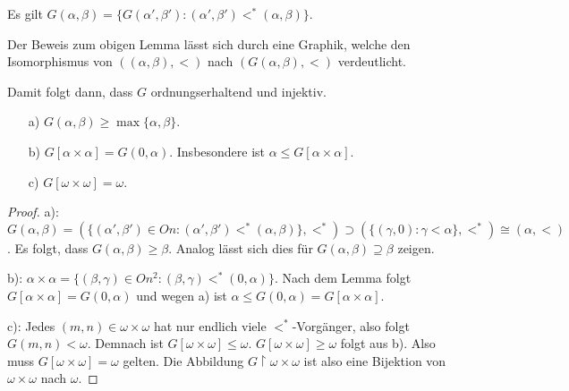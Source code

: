 \begin{lemma}
	Es gilt $G(\alpha,\beta)=\{G(\alpha',\beta'):(\alpha',\beta')<^\ast(\alpha,\beta)\}$.
\end{lemma}
Der Beweis zum obigen Lemma lässt sich durch eine Graphik, welche den Isomorphismus von $((\alpha,\beta),<)$ nach $(G(\alpha,\beta), <)$ verdeutlicht.

Damit folgt dann, dass $G$ ordnungserhaltend und injektiv.

\begin{lemma}
	\begin{itemize}
		\item[a)] $G(\alpha, \beta)\geq\max\{\alpha,\beta\}$.
		\item[b)] $G[\alpha\times\alpha]=G(0,\alpha)$. Insbesondere ist $\alpha \leq G[\alpha\times\alpha]$.
		\item[c)] $G[\omega\times\omega]=\omega$.
	\end{itemize}
\end{lemma}
\begin{proof}
	a): $G(\alpha,\beta)=(\{(\alpha',\beta')\in On : (\alpha',\beta')<^\ast(\alpha,\beta)\}, <^\ast)\supset(\{(\gamma,0):\gamma<\alpha\}, <^\ast)\cong(\alpha,<)$. Es folgt, dass $G(\alpha,\beta)\geq\beta$. Analog lässt sich dies für $G(\alpha,\beta)\supseteq\beta$ zeigen.
	
	b): $\alpha\times\alpha=\{(\beta,\gamma)\in On^2 : (\beta,\gamma)<^\ast(0,\alpha)\}$. Nach dem Lemma folgt $G[\alpha\times\alpha]=G(0,\alpha)$ und wegen a) ist $\alpha\leq G(0,\alpha)=G[\alpha\times \alpha]$.
	
	c): Jedes $(m,n)\in\omega\times\omega$ hat nur endlich viele $<^\ast$-Vorgänger, also folgt $G(m,n)<\omega$. Demnach ist $G[\omega\times\omega]\leq\omega$. $G[\omega\times\omega]\geq\omega$ folgt aus b). Also muss $G[\omega\times\omega]=\omega$ gelten. Die Abbildung $G\upharpoonright\omega\times\omega$ ist also eine Bijektion von $\omega\times\omega$ nach $\omega$.
\end{proof}

